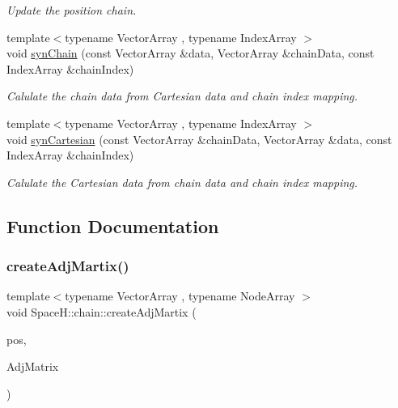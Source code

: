 \begin{DoxyCompactItemize}
\begin{DoxyCompactList}\small\item\em Update the position chain. \end{DoxyCompactList}\item 
{\footnotesize template$<$typename Vector\+Array , typename Index\+Array $>$ }\\void \mbox{\hyperlink{namespace_space_h_1_1chain_a218de9c738267dd3efceebfda0a90a43}{syn\+Chain}} (const Vector\+Array \&data, Vector\+Array \&chain\+Data, const Index\+Array \&chain\+Index)
\begin{DoxyCompactList}\small\item\em Calulate the chain data from Cartesian data and chain index mapping. \end{DoxyCompactList}\item 
{\footnotesize template$<$typename Vector\+Array , typename Index\+Array $>$ }\\void \mbox{\hyperlink{namespace_space_h_1_1chain_a1ba7809b40a52959d0566753b1c2eaee}{syn\+Cartesian}} (const Vector\+Array \&chain\+Data, Vector\+Array \&data, const Index\+Array \&chain\+Index)
\begin{DoxyCompactList}\small\item\em Calulate the Cartesian data from chain data and chain index mapping. \end{DoxyCompactList}\end{DoxyCompactItemize}


\subsection{Function Documentation}
\mbox{\label{namespace_space_h_1_1chain_a8d2f8c8026f24294d16309c4f2e11fdb}} 
\subsubsection{\texorpdfstring{create\+Adj\+Martix()}{createAdjMartix()}}
{\footnotesize\ttfamily template$<$typename Vector\+Array , typename Node\+Array $>$ \\
void Space\+H\+::chain\+::create\+Adj\+Martix (\begin{DoxyParamCaption}\item[{const Vector\+Array \&}]{pos,  }\item[{Node\+Array \&}]{Adj\+Matrix }\end{DoxyParamCaption})}



